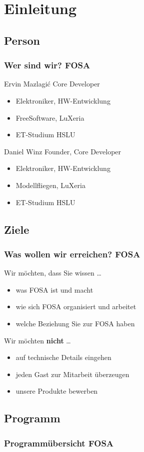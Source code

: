 \section{Einleitung}

\subsection{Person}
\begin{frame}
	\frametitle{Wer sind wir? \hfill{} \footnotesize{FOSA}}
	\begin{block}{Ervin Mazlagi\'c 
		\hfill{} 
		\footnotesize{Core Developer}}
		\begin{itemize}
			\item Elektroniker, HW-Entwicklung
			\item FreeSoftware, LuXeria
			\item ET-Studium HSLU
		\end{itemize}
	\end{block}
	\vfill{}
	\begin{block}{Daniel Winz
		\hfill{}
		\footnotesize{Founder, Core Developer}}
		\begin{itemize}
			\item Elektroniker, HW-Entwicklung
			\item Modellfliegen, LuXeria
			\item ET-Studium HSLU
		\end{itemize}
    	\end{block}
\end{frame}

\subsection{Ziele}
\begin{frame}
	\frametitle{Was wollen wir erreichen? \hfill{} \footnotesize{FOSA}}
	\begin{exampleblock}{Wir möchten, dass Sie wissen \dots}
		\begin{itemize}
			\item was FOSA ist und macht
			\item wie sich FOSA organisiert und arbeitet
			\item welche Beziehung Sie zur FOSA haben
		\end{itemize}
	\end{exampleblock}
	\vfill{}
	\begin{alertblock}{Wir möchten \textbf{nicht} \dots}
		\begin{itemize}
			\item auf technische Details eingehen
			\item jeden Gast zur Mitarbeit überzeugen
			\item unsere Produkte bewerben
		\end{itemize}
	\end{alertblock}
\end{frame}

\subsection{Programm}
\begin{frame}
    \frametitle{Programmübersicht \hfill{} \footnotesize{FOSA}}
    \tableofcontents
\end{frame}
